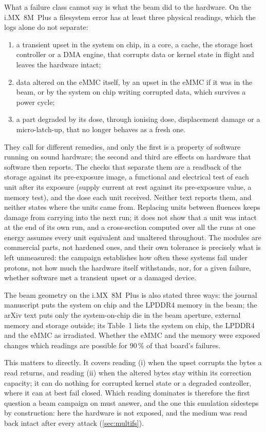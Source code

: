 What a failure class cannot say is what the beam did to the hardware. On
the i.MX~8M~Plus a filesystem error has at least three physical
readings, which the logs alone do not separate:
\begin{enumerate}[label=(\roman*)]
\item a transient upset in the system on chip, in a core, a cache, the
  storage host controller or a DMA engine, that corrupts data or kernel
  state in flight and leaves the hardware intact;
\item data altered on the eMMC itself, by an upset in the eMMC if it was
  in the beam, or by the system on chip writing corrupted data, which
  survives a power cycle;
\item a part degraded by its dose, through ionising dose, displacement
  damage or a micro-latch-up, that no longer behaves as a fresh one.
\end{enumerate}
They call for different remedies, and only the first is a property of
software running on sound hardware; the second and third are effects on
hardware that software then reports. The checks that separate them are a readback of the storage
against its pre-exposure image, a functional and electrical test of each
unit after its exposure (supply current at rest against its pre-exposure
value, a memory test), and the dose each unit received. Neither text
reports them, and neither states where the units came from. Replacing
units between fluences keeps damage from carrying into the next run; it
does not show that a unit was intact at the end of its own run, and a
cross-section computed over all the runs at one energy assumes every
unit equivalent and unaltered throughout. The modules are commercial parts, not hardened
ones, and their own tolerance is precisely what is left unmeasured: the
campaign establishes how often these systems fail under protons, not how
much the hardware itself withstands, nor, for a given failure, whether
software met a transient upset or a damaged device.

The beam geometry on the i.MX~8M~Plus is also stated three ways: the
journal manuscript puts the system on chip and the LPDDR4 memory in the
beam; the arXiv text puts only the system-on-chip die in the beam
aperture, external memory and storage outside; its Table~1 lists the
system on chip, the LPDDR4 and the eMMC as irradiated. Whether the eMMC
and the memory were exposed changes which readings are possible for
90\,\% of that board's failures.

This matters to \bfs directly. It covers reading (i) when the upset
corrupts the bytes a read returns, and reading (ii) when the altered
bytes stay within its correction capacity; it can do nothing for
corrupted kernel state or a degraded controller, where it can at best
fail closed. Which reading dominates is therefore the first question a
beam campaign on \bfs must answer, and the one this emulation sidesteps
by construction: here the hardware is not exposed, and the medium was
read back intact after every attack (\cref{sec:multifs}).


